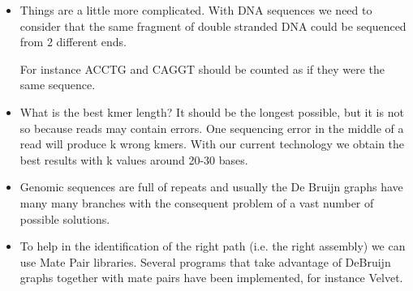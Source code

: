 \begin{itemize}
	\item Things are a little more complicated. With DNA sequences we need to
consider that the same fragment of double stranded DNA could be sequenced
from 2 different ends.

For instance ACCTG and CAGGT should be counted as if they were the same
sequence. 
	\item What is the best kmer length? It should be the longest possible, but
it is not so because reads may contain errors.
One sequencing error in the middle of a read will produce k wrong kmers.
With our current technology we obtain the best results with k values around
20-30 bases.
	\item Genomic sequences are full of repeats and usually the De Bruijn
graphs have many many branches with the consequent problem of a vast number
of possible solutions.
	\item To help in the identification of the right path (i.e. the right
assembly) we can use Mate Pair libraries.
Several programs that take advantage of DeBruijn graphs together 
with mate pairs have been implemented, for instance Velvet. 
\end{itemize}
